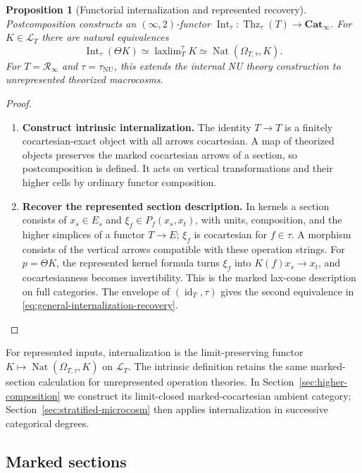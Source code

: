 \documentclass[oneside]{article}
\theoremstyle{plain}
\newtheorem{proposition}[theorem]{Proposition}
\theoremstyle{definition}
\theoremstyle{remark}
\newcommand{\Cat}{\mathbf{Cat}_{\infty}}
\newcommand{\Int}{\operatorname{Int}}
\newcommand{\NU}{\mathrm{NU}}
\newcommand{\Nat}{\operatorname{Nat}}
\newcommand{\RNU}{\mathcal R_{\infty}}
\newcommand{\Thz}{\operatorname{Thz}}
\newcommand{\id}{\operatorname{id}}
\newcommand{\laxlim}{\mathop{\mathrm{laxlim}}}
\begin{document}
\begin{proposition}[Functorial internalization and represented recovery]
\label{prop:general-internalization}
Postcomposition constructs an $(\infty,2)$-functor
$\Int_\tau:\Thz_\tau(T)\to\Cat$.
For $K\in\mathcal L_T$ there are natural equivalences
\begin{equation}\label{eq:general-internalization-recovery}
 \Int_\tau(\Theta K)
 \simeq\laxlim_T^\tau K
 \simeq\Nat(\Omega_{T,\tau},K).
\end{equation}
For $T=\RNU$ and $\tau=\tau_{\NU}$, this extends the internal
NU theory construction to unrepresented theorized macrocosms.
\end{proposition}
\begin{proof}
\leavevmode
\begin{enumerate}
\item \textbf{Construct intrinsic internalization.}
The identity $T\to T$ is a finitely cocartesian-exact object with all
arrows cocartesian. A map of theorized objects preserves the marked
cocartesian arrows of a section, so postcomposition is defined. It acts
on vertical transformations and their higher cells by ordinary functor
composition.


\item \textbf{Recover the represented section description.}
In kernels a section consists of $x_s\in E_s$ and
$\xi_f\in P_f(x_s,x_t)$, with units, composition, and the higher
simplices of a functor $T\to E$; $\xi_f$ is cocartesian for
$f\in\tau$. A morphism consists of the vertical arrows compatible
with these operation strings. For $p=\Theta K$, the represented kernel
formula turns $\xi_f$ into $K(f)x_s\to x_t$, and cocartesianness
becomes invertibility. This is the marked lax-cone description on full
categories. The envelope of $(\id_T,\tau)$ gives the second
equivalence in \eqref{eq:general-internalization-recovery}.
\qedhere
\end{enumerate}
\end{proof}

For represented inputs, internalization is the limit-preserving
functor $K\mapsto\Nat(\Omega_{T,\tau},K)$ on $\mathcal L_T$.
The intrinsic definition retains the same marked-section calculation
for unrepresented operation theories. In
Section~\ref{sec:higher-composition} we construct its limit-closed
marked-cocartesian ambient category; Section~\ref{sec:stratified-microcosm}
then applies internalization in successive categorical degrees.

\subsection{Marked sections}
\end{document}
